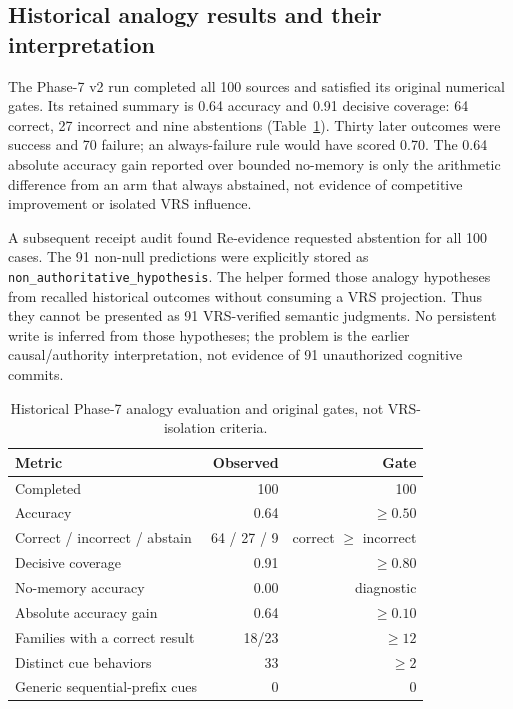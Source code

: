\documentclass[11pt]{article}
\begin{document}
\subsection{Historical analogy results and their interpretation}

The Phase-7 v2 run completed all 100 sources and satisfied its original numerical gates. Its retained summary is 0.64 accuracy and 0.91 decisive coverage: 64 correct, 27 incorrect and nine abstentions (Table~\ref{tab:heldout}). Thirty later outcomes were success and 70 failure; an always-failure rule would have scored 0.70. The 0.64 absolute accuracy gain reported over bounded no-memory is only the arithmetic difference from an arm that always abstained, not evidence of competitive improvement or isolated VRS influence.

A subsequent receipt audit found Re-evidence requested abstention for all 100 cases. The 91 non-null predictions were explicitly stored as \texttt{non\_authoritative\_hypothesis}. The helper formed those analogy hypotheses from recalled historical outcomes without consuming a VRS projection. Thus they cannot be presented as 91 VRS-verified semantic judgments. No persistent write is inferred from those hypotheses; the problem is the earlier causal/authority interpretation, not evidence of 91 unauthorized cognitive commits.

\begin{table}[t]
\centering
\caption{Historical Phase-7 analogy evaluation and original gates, not VRS-isolation criteria.}
\label{tab:heldout}
\begin{tabular}{lrr}
\toprule
Metric & Observed & Gate \\
\midrule
Completed & 100 & 100 \\
Accuracy & 0.64 & $\geq 0.50$ \\
Correct / incorrect / abstain & 64 / 27 / 9 & correct $\geq$ incorrect \\
Decisive coverage & 0.91 & $\geq 0.80$ \\
No-memory accuracy & 0.00 & diagnostic \\
Absolute accuracy gain & 0.64 & $\geq 0.10$ \\
Families with a correct result & 18/23 & $\geq 12$ \\
Distinct cue behaviors & 33 & $\geq 2$ \\
Generic sequential-prefix cues & 0 & 0 \\
\bottomrule
\end{tabular}
\end{table}
\end{document}
